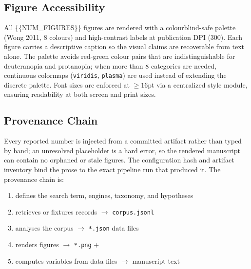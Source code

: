 \documentclass[
]{article}
\providecommand{\tightlist}{%
  \setlength{\itemsep}{0pt}\setlength{\parskip}{0pt}}
\begin{document}
\subsection{Figure Accessibility}\label{figure-accessibility}

All \{\{NUM\_FIGURES\}\} figures are rendered with a colourblind-safe
palette (Wong 2011, 8 colours) and high-contrast labels at publication
DPI (300). Each figure carries a descriptive caption so the visual
claims are recoverable from text alone. The palette avoids red-green
colour pairs that are indistinguishable for deuteranopia and protanopia;
when more than 8 categories are needed, continuous colormaps
(\texttt{viridis}, \texttt{plasma}) are used instead of extending the
discrete palette. Font sizes are enforced at \(\geq 16\)pt via a
centralized style module, ensuring readability at both screen and print
sizes.

\subsection{Provenance Chain}\label{provenance-chain}

Every reported number is injected from a committed artifact rather than
typed by hand; an unresolved placeholder is a hard error, so the
rendered manuscript can contain no orphaned or stale figures. The
configuration hash and artifact inventory bind the prose to the exact
pipeline run that produced it. The provenance chain is:

\begin{enumerate}
\def\labelenumi{\arabic{enumi}.}
\tightlist
\item
   defines the search term, engines,
  taxonomy, and hypotheses
\item
   retrieves or fixtures
  records \texorpdfstring{\ensuremath{\to}}{->} \texttt{corpus.jsonl}
\item
   analyses the corpus \texorpdfstring{\ensuremath{\to}}{->}
  \texttt{*.json} data files
\item
   renders figures \texorpdfstring{\ensuremath{\to}}{->}
  \texttt{*.png} + 
\item
   computes variables from data
  files \texorpdfstring{\ensuremath{\to}}{->} manuscript text
\end{enumerate}
\end{document}
